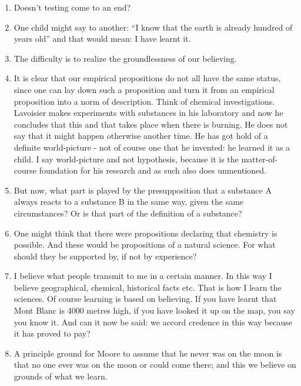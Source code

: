 \documentclass{book}
\begin{document}
\begin{enumerate}
\item
Doesn't testing come to an end?

\item
One child might say to another: ``I know that the earth is already hundred of
years old'' and that would mean: I have learnt it.

\item
The difficulty is to realize the groundlessness of our believing.

\item
It is clear that our empirical propositions do not all have the same status,
since one can lay down such a proposition and turn it from an empirical
proposition into a norm of description.  Think of chemical investigations.
Lavoisier makes experiments with substances in his laboratory and now he
concludes that this and that takes place when there is burning. He does not say
that it might happen otherwise another time. He has got hold of a definite
world-picture - not of course one that he invented: he learned it as a child. I
say world-picture and not hypothesis, because it is the matter-of-course
foundation for his research and as such also does unmentioned.

\item
But now, what part is played by the presupposition that a substance A always
reacts to a substance B in the same way, given the same circumstances? Or is
that part of the definition of a substance?

\item
One might think that there were propositions declaring that chemistry is
possible. And these would be propositions of a natural science. For what should
they be supported by, if not by experience?

\item
I believe what people transmit to me in a certain manner. In this way I believe
geographical, chemical, historical facts etc. That is how I learn the sciences.
Of course learning is based on believing.  If you have learnt that Mont Blanc
is 4000 metres high, if you have looked it up on the map, you say you know it.
And can it now be said: we accord credence in this way because it has proved to
pay?

\item
A principle ground for Moore to assume that he never was on the moon is that no
one ever was on the moon or could come there; and this we believe on grounds of
what we learn.


\end{enumerate}
\end{document}
